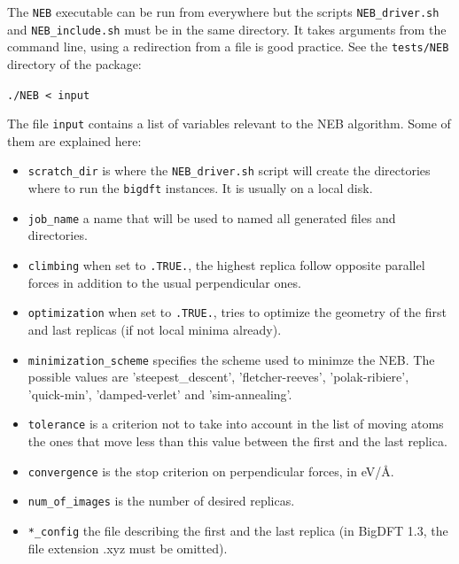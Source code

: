 \documentclass[a4paper,11pt]{report}
\begin{document}
The \texttt{NEB} executable can be run from everywhere but the scripts \texttt{NEB\_driver.sh} and \texttt{NEB\_include.sh} must be in the same directory. It takes arguments from the command line, using a redirection from a file is good practice. See the \texttt{tests/NEB} directory of the package:
\begin{center}
  \texttt{./NEB < input}
\end{center}
The file \texttt{input} contains a list of variables relevant to the NEB algorithm. Some of them are explained here:
\begin{itemize}
  \item \texttt{scratch\_dir} is where the \texttt{NEB\_driver.sh} script will create the directories where to run the \texttt{bigdft} instances. It is usually on a local disk.
  \item \texttt{job\_name} a name that will be used to named all generated files and directories.
  \item \texttt{climbing} when set to \texttt{.TRUE.}, the highest replica follow opposite parallel forces in addition to the usual perpendicular ones.
  \item \texttt{optimization} when set to \texttt{.TRUE.}, tries to optimize the geometry of the first and last replicas (if not local minima already).
  \item \texttt{minimization\_scheme} specifies the scheme used to minimze the NEB. The possible values are 'steepest\_descent', 'fletcher-reeves', 'polak-ribiere', \hfill\\ 'quick-min', 'damped-verlet' and 'sim-annealing'.
  \item \texttt{tolerance} is a criterion not to take into account in the list of moving atoms the ones that move less than this value between the first and the last replica.
  \item \texttt{convergence} is the stop criterion on perpendicular forces, in eV/\AA.
  \item \texttt{num\_of\_images} is the number of desired replicas.
  \item \texttt{*\_config} the file describing the first and the last replica (in BigDFT 1.3, the file extension .xyz must be omitted).
\end{itemize}
\end{document}
